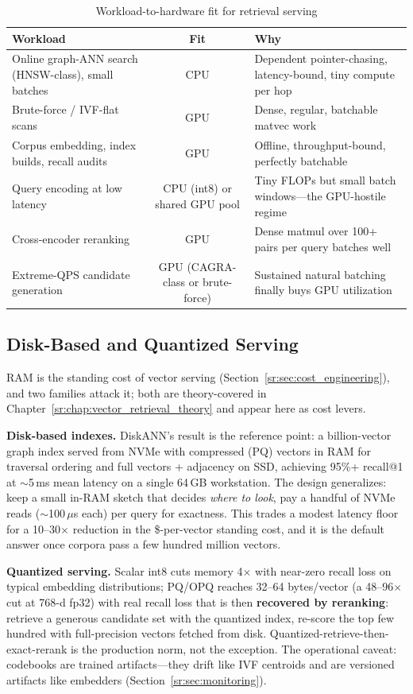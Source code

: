 \begin{table}[H]
\centering
\small
\caption{Workload-to-hardware fit for retrieval serving}
\label{sr:tab:cpu_gpu_fit}
\begin{tabularx}{\textwidth}{lcX}
\toprule
\textbf{Workload} & \textbf{Fit} & \textbf{Why} \\
\midrule
Online graph-ANN search (HNSW-class), small batches & CPU & Dependent pointer-chasing, latency-bound, tiny compute per hop \\
Brute-force / IVF-flat scans & GPU & Dense, regular, batchable matvec work \\
Corpus embedding, index builds, recall audits & GPU & Offline, throughput-bound, perfectly batchable \\
Query encoding at low latency & CPU (int8) or shared GPU pool & Tiny FLOPs but small batch windows---the GPU-hostile regime \\
Cross-encoder reranking & GPU & Dense matmul over 100+ pairs per query batches well \\
Extreme-QPS candidate generation & GPU (CAGRA-class or brute-force) & Sustained natural batching finally buys GPU utilization \\
\bottomrule
\end{tabularx}
\end{table}

\subsection{Disk-Based and Quantized Serving}

RAM is the standing cost of vector serving (Section~\ref{sr:sec:cost_engineering}), and two families attack it; both are theory-covered in Chapter~\ref{sr:chap:vector_retrieval_theory} and appear here as cost levers.

\textbf{Disk-based indexes.} DiskANN's result is the reference point: a billion-vector graph index served from NVMe with compressed (PQ) vectors in RAM for traversal ordering and full vectors + adjacency on SSD, achieving 95\%+ recall@1 at $\sim$5\,ms mean latency on a single 64\,GB workstation. The design generalizes: keep a small in-RAM sketch that decides \textit{where to look}, pay a handful of NVMe reads ($\sim$100\,$\mu$s each) per query for exactness. This trades a modest latency floor for a 10--30$\times$ reduction in the \$-per-vector standing cost, and it is the default answer once corpora pass a few hundred million vectors.

\textbf{Quantized serving.} Scalar int8 cuts memory 4$\times$ with near-zero recall loss on typical embedding distributions; PQ/OPQ reaches 32--64 bytes/vector (a 48--96$\times$ cut at 768-d fp32) with real recall loss that is then \textbf{recovered by reranking}: retrieve a generous candidate set with the quantized index, re-score the top few hundred with full-precision vectors fetched from disk. Quantized-retrieve-then-exact-rerank is the production norm, not the exception. The operational caveat: codebooks are trained artifacts---they drift like IVF centroids and are versioned artifacts like embedders (Section~\ref{sr:sec:monitoring}).

